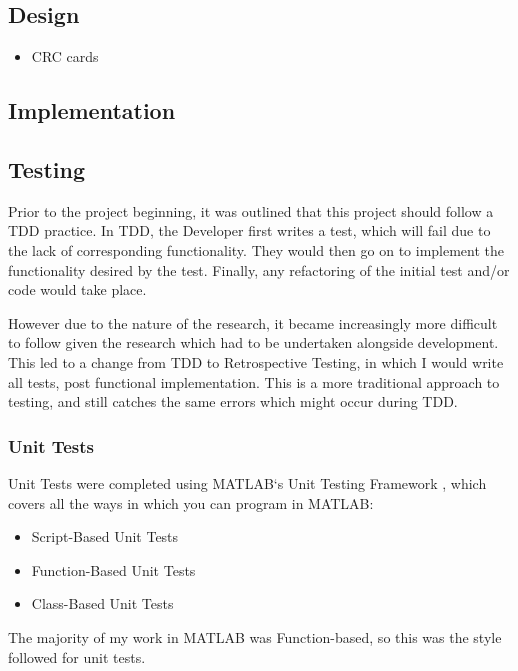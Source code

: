 \subsection{Design}

\begin{itemize}
\item CRC cards
\end{itemize}

\subsection{Implementation}

\subsection{Testing}

Prior to the project beginning, it was outlined that this project should follow a \acrshort{TDD} practice. In \acrshort{TDD}, the Developer first writes a test, which will fail due to the lack of corresponding functionality. They would then go on to implement the functionality desired by the test. Finally, any refactoring of the initial test and/or code would take place.

However due to the nature of the research, it became increasingly more difficult to follow given the research which had to be undertaken alongside development. This led to a change from \acrshort{TDD} to Retrospective Testing, in which I would write all tests, post functional implementation. This is a more traditional approach to testing, and still catches the same errors which might occur during \acrshort{TDD}.

\subsubsection{Unit Tests}

Unit Tests were completed using MATLAB`s Unit Testing Framework \cite{testing}, which covers all the ways in which you can program in MATLAB:

\begin{itemize}
  \item Script-Based Unit Tests
  \item Function-Based Unit Tests
  \item Class-Based Unit Tests
  \end{itemize}

The majority of my work in MATLAB was Function-based, so this was the style followed for unit tests.

